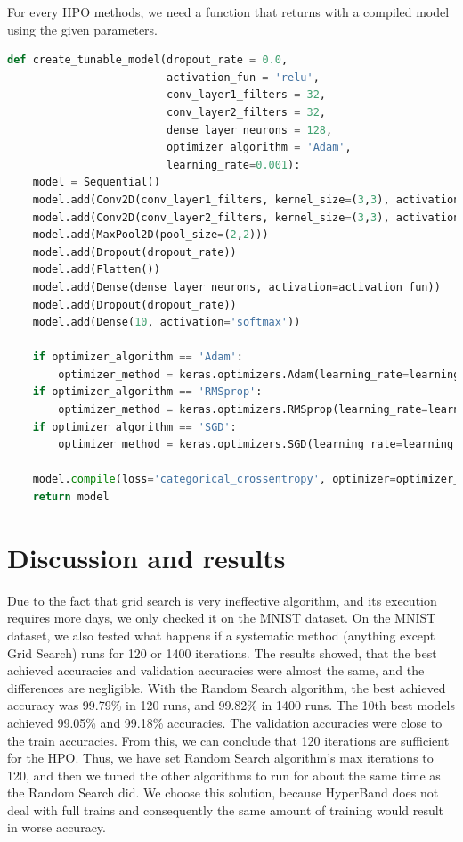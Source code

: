\documentclass[conference]{IEEEtran}
\begin{document}
For every HPO methods, we need a function that returns with a compiled model using the given parameters.
\begin{lstlisting}[language=Python]
def create_tunable_model(dropout_rate = 0.0,
                         activation_fun = 'relu',
                         conv_layer1_filters = 32,
                         conv_layer2_filters = 32,
                         dense_layer_neurons = 128,
                         optimizer_algorithm = 'Adam',
                         learning_rate=0.001):
    model = Sequential()
    model.add(Conv2D(conv_layer1_filters, kernel_size=(3,3), activation=activation_fun, input_shape=(28,28,1) ))
    model.add(Conv2D(conv_layer2_filters, kernel_size=(3,3), activation=activation_fun ))
    model.add(MaxPool2D(pool_size=(2,2)))
    model.add(Dropout(dropout_rate))
    model.add(Flatten())
    model.add(Dense(dense_layer_neurons, activation=activation_fun))
    model.add(Dropout(dropout_rate))
    model.add(Dense(10, activation='softmax'))

    if optimizer_algorithm == 'Adam':
        optimizer_method = keras.optimizers.Adam(learning_rate=learning_rate)
    if optimizer_algorithm == 'RMSprop':
        optimizer_method = keras.optimizers.RMSprop(learning_rate=learning_rate)
    if optimizer_algorithm == 'SGD':
        optimizer_method = keras.optimizers.SGD(learning_rate=learning_rate)
       
    model.compile(loss='categorical_crossentropy', optimizer=optimizer_method, metrics=['accuracy'])
    return model
\end{lstlisting}

\section{Discussion and results}
Due to the fact that grid search is very ineffective algorithm, and its execution requires more days, we only checked it on the MNIST dataset. On the MNIST dataset, we also tested what happens if a systematic method (anything except Grid Search) runs for 120 or 1400 iterations. The results showed, that the best achieved accuracies and validation accuracies were almost the same, and the differences are negligible. With the Random Search algorithm, the best achieved accuracy was 99.79\% in 120 runs, and 99.82\% in 1400 runs. The 10th best models achieved 99.05\% and 99.18\% accuracies. The validation accuracies were close to the train accuracies. From this, we can conclude that 120 iterations are sufficient for the HPO. Thus, we have set Random Search algorithm's max iterations to 120, and then we tuned the other algorithms to run for about the same time as the Random Search did. We choose this solution, because HyperBand does not deal with full trains and consequently the same amount of training would result in worse accuracy.
\end{document}
